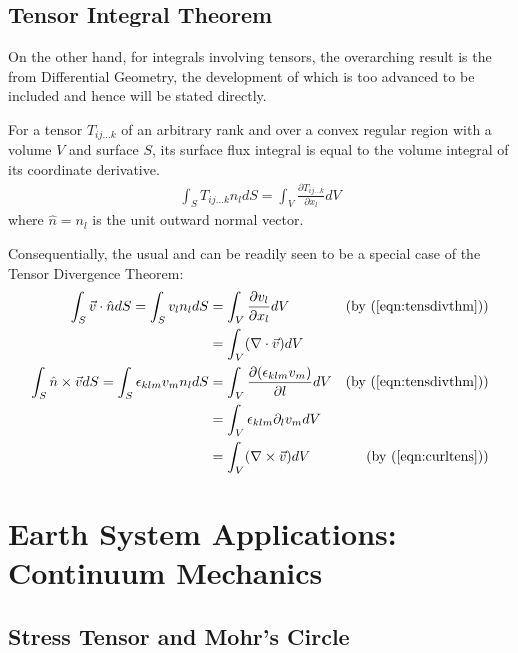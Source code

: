 \subsection{Tensor Integral Theorem}

On the other hand, for integrals involving tensors, the overarching result is the  from Differential Geometry, the development of which is too advanced to be included and hence will be stated directly.
\begin{thm}
For a tensor $T_{ij\ldots k}$ of an arbitrary rank and over a convex regular region with a volume $V$ and surface $S$, its surface flux integral is equal to the volume integral of its coordinate derivative.
\begin{align}
\int_S T_{ij\ldots k}n_l dS = \int_V \frac{\partial T_{ij\ldots k}}{\partial x_l} dV \label{eqn:tensdivthm}
\end{align}
where $\hat{n} = n_l$ is the unit outward normal vector.
\end{thm}
Consequentially, the usual  and  can be readily seen to be a special case of the Tensor Divergence Theorem:
\begin{align}
\int_S \vec{v}\cdot \hat{n} dS = \int_S v_ln_l dS &= \int_V \frac{\partial v_l}{\partial x_l} dV \nonumber &\text{(by (\ref{eqn:tensdivthm}))} \\ 
&= \int_V (\nabla \cdot \vec{v}) dV \label{eqn:divthm} \\
\int_S \hat{n} \times \vec{v} dS = \int_S \epsilon_{klm}v_mn_l dS &= \int_V \frac{\partial (\epsilon_{klm}v_m)}{\partial l} dV \nonumber &\text{(by (\ref{eqn:tensdivthm}))} \\
&= \int_V \epsilon_{klm}\partial_lv_m dV \nonumber \\
&= \int_V (\nabla \times \vec{v}) dV &\text{(by (\ref{eqn:curltens}))} \label{eqn:stokes}
\end{align}

\section{Earth System Applications: Continuum Mechanics}

\subsection{Stress Tensor and Mohr’s Circle}

